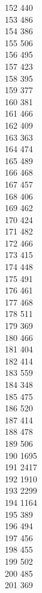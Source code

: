 { 152	440 \\
 153	486 \\
 154	386 \\
 155	506 \\
 156	495 \\
 157	423 \\
 158	395 \\
 159	377 \\
 160	381 \\
 161	466 \\
 162	409 \\
 163	363 \\
 164	474 \\
 165	489 \\
 166	468 \\
 167	457 \\
 168	406 \\
 169	462 \\
 170	424 \\
 171	482 \\
 172	466 \\
 173	415 \\
 174	448 \\
 175	491 \\
 176	461 \\
 177	468 \\
 178	511 \\
 179	369 \\
 180	466 \\
 181	404 \\
 182	414 \\
 183	559 \\
 184	348 \\
 185	475 \\
 186	520 \\
 187	414 \\
 188	478 \\
 189	506 \\
 190	1695 \\
 191	2417 \\
 192	1910 \\
 193	2299 \\
 194	1164 \\
 195	389 \\
 196	494 \\
 197	456 \\
 198	455 \\
 199	502 \\
 200	485 \\
 201	369 \\
}

